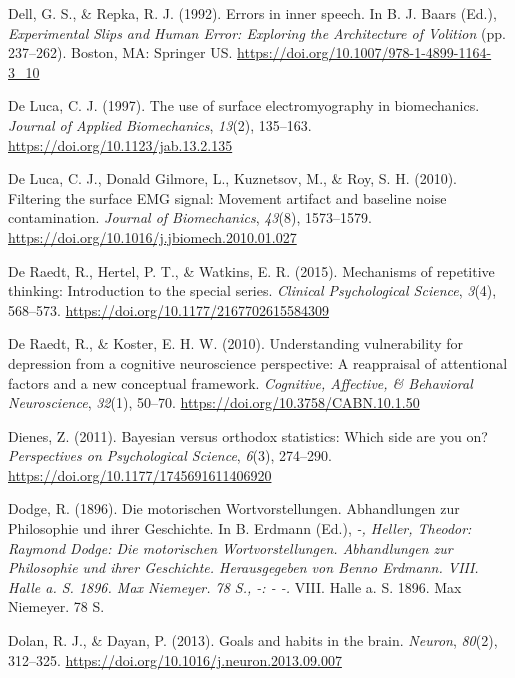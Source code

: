 \documentclass[a4paper,12pt,twoside,onecolumn,openright,final,oldfontcommands]{memoir}
\begin{document}
\leavevmode\hypertarget{ref-dell_errors_1992}{}%
Dell, G. S., \& Repka, R. J. (1992). Errors in inner speech. In B. J. Baars (Ed.), \emph{Experimental Slips and Human Error: Exploring the Architecture of Volition} (pp. 237--262). Boston, MA: Springer US. \url{https://doi.org/10.1007/978-1-4899-1164-3_10}

\leavevmode\hypertarget{ref-de_luca_use_1997}{}%
De Luca, C. J. (1997). The use of surface electromyography in biomechanics. \emph{Journal of Applied Biomechanics}, \emph{13}(2), 135--163. \url{https://doi.org/10.1123/jab.13.2.135}

\leavevmode\hypertarget{ref-de_luca_filtering_2010}{}%
De Luca, C. J., Donald Gilmore, L., Kuznetsov, M., \& Roy, S. H. (2010). Filtering the surface EMG signal: Movement artifact and baseline noise contamination. \emph{Journal of Biomechanics}, \emph{43}(8), 1573--1579. \url{https://doi.org/10.1016/j.jbiomech.2010.01.027}

\leavevmode\hypertarget{ref-de_raedt_mechanisms_2015}{}%
De Raedt, R., Hertel, P. T., \& Watkins, E. R. (2015). Mechanisms of repetitive thinking: Introduction to the special series. \emph{Clinical Psychological Science}, \emph{3}(4), 568--573. \url{https://doi.org/10.1177/2167702615584309}

\leavevmode\hypertarget{ref-Raedt2010}{}%
De Raedt, R., \& Koster, E. H. W. (2010). Understanding vulnerability for depression from a cognitive neuroscience perspective: A reappraisal of attentional factors and a new conceptual framework. \emph{Cognitive, Affective, \& Behavioral Neuroscience}, \emph{32}(1), 50--70. \url{https://doi.org/10.3758/CABN.10.1.50}

\leavevmode\hypertarget{ref-dienes_bayesian_2011}{}%
Dienes, Z. (2011). Bayesian versus orthodox statistics: Which side are you on? \emph{Perspectives on Psychological Science}, \emph{6}(3), 274--290. \url{https://doi.org/10.1177/1745691611406920}

\leavevmode\hypertarget{ref-dodge_motorischen_1896}{}%
Dodge, R. (1896). Die motorischen Wortvorstellungen. Abhandlungen zur Philosophie und ihrer Geschichte. In B. Erdmann (Ed.), \emph{-, Heller, Theodor: Raymond Dodge: Die motorischen Wortvorstellungen. Abhandlungen zur Philosophie und ihrer Geschichte. Herausgegeben von Benno Erdmann. VIII. Halle a. S. 1896. Max Niemeyer. 78 S., -: - -.} VIII. Halle a. S. 1896. Max Niemeyer. 78 S.

\leavevmode\hypertarget{ref-dolan_goals_2013}{}%
Dolan, R. J., \& Dayan, P. (2013). Goals and habits in the brain. \emph{Neuron}, \emph{80}(2), 312--325. \url{https://doi.org/10.1016/j.neuron.2013.09.007}
\end{document}

